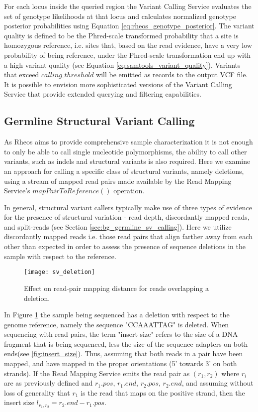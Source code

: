 For each locus inside the queried region the Variant Calling Service evaluates the set of genotype likelihoods at that locus and calculates normalized genotype posterior probabilities using Equation \ref{eq:rheos_genotype_posterior}. The variant quality is defined to be the Phred-scale transformed probability that a site is homozygous reference, i.e. sites that, based on the read evidence, have a very low probability of being reference, under the Phred-scale transformation end up with a high variant quality (see Equation \ref{eq:samtools_variant_quality}). Variants that exceed $calling\_threshold$ will be emitted as records to the output VCF file. It is possible to envision more sophisticated versions of the Variant Calling Service that provide extended querying and filtering capabilities.

\subsection{Germline Structural Variant Calling}\label{sec:main_body_sv_calling}

As Rheos aims to provide comprehensive sample characterization it is not enough to only be able to call single nucleotide polymorphisms, the ability to call other variants, such as indels and structural variants is also required. Here we examine an approach for calling a specific class of structural variants, namely deletions, using a stream of mapped read pairs made available by the Read Mapping Service's $mapPairToReference()$ operation. 

In general, structural variant callers typically make use of three types of evidence for the presence of structural variation - read depth, discordantly mapped reads, and split-reads (see Section \ref{sec:bg_germline_sv_calling}). Here we utilize discordantly mapped reads i.e. those read pairs that align farther away from each other than expected in order to assess the presence of sequence deletions in the sample with respect to the reference.

\begin{figure}[H]
    \texttt{[image: sv\_deletion]}
    \centering
    \caption {Effect on read-pair mapping distance for reads overlapping a deletion.}
    \label{fig:sv_deletion}
\end{figure}

In Figure \ref{fig:sv_deletion} the sample being sequenced has a deletion with respect to the genome reference, namely the sequence "CCAAATTAG" is deleted. When sequencing with read pairs, the term "insert size" refers to the size of a DNA fragment that is being sequenced, less the size of the sequence adapters on both ends(see \ref{fig:insert_size}). Thus, assuming that both reads in a pair have been mapped, and have mapped in the proper orientations (5' towards 3' on both strands). If the Read Mapping Service emits the read pair as $(r_1, r_2)$ where $r_i$ are as previously defined and $r_1.pos$, $r_1.end$, $r_2.pos$, $r_2.end$, and assuming without loss of generality that $r_1$ is the read that maps on the positive strand, then the insert size $l_{r_1,r_2} = r_2.end - r_1.pos$.    

